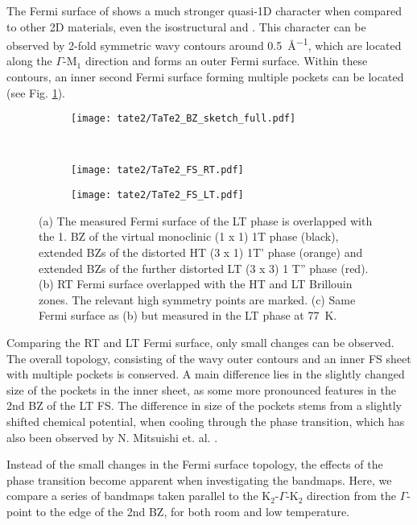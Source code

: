 The Fermi surface of  shows a much stronger quasi-1D character when compared to other 2D materials, even the isostructural  and .
This character can be observed by 2-fold symmetric wavy contours around \qty{0.5}{\angstrom^{-1}}, which are located along the $\Gamma$-M$_1$ direction and forms an outer Fermi surface.
Within these contours, an inner second Fermi surface forming multiple pockets can be located (see Fig. \ref{fig:TaTe_FS}).

\begin{figure}[h!]
	\centering
	\begin{subfigure}[b]{0.5\textwidth}
		\texttt{[image: tate2/TaTe2\_BZ\_sketch\_full.pdf]}
		\caption{}
	\end{subfigure}
	\hfill
	\\
	\begin{subfigure}[b]{0.49\textwidth}
		\texttt{[image: tate2/TaTe2\_FS\_RT.pdf]}
		\caption{}
	\end{subfigure}
	\hfill
	\begin{subfigure}[b]{0.49\textwidth}
		\texttt{[image: tate2/TaTe2\_FS\_LT.pdf]}
		\caption{}
	\end{subfigure}
	\caption{(a) The measured Fermi surface of the LT phase is overlapped with the 1. BZ of the virtual monoclinic (1 x 1) 1T phase (black), extended BZs of the distorted HT (3 x 1) 1T' phase (orange) and extended BZs of the further distorted LT (3 x 3) 1 T'' phase (red). (b) RT Fermi surface overlapped with the HT and LT Brillouin zones. The relevant high symmetry points are marked. (c) Same Fermi surface as (b) but measured in the LT phase at \qty{77}{\kelvin}.}
	\label{fig:TaTe_FS}
\end{figure}

Comparing the RT and LT Fermi surface, only small changes can be observed.
The overall topology, consisting of the wavy outer contours and an inner FS sheet with multiple pockets is conserved.
A main difference lies in the slightly changed size of the pockets in the inner sheet, as some more pronounced features in the 2nd BZ of the LT FS.
The difference in size of the pockets stems from a slightly shifted chemical potential, when cooling through the phase transition, which has also been observed by N. Mitsuishi et. al. \cite{mitsuishi_unveiling_2024}.

Instead of the small changes in the Fermi surface topology, the effects of the phase transition become apparent when investigating the bandmaps.
Here, we compare a series of bandmaps taken parallel to the K$_2$-$\Gamma$-K$_2$ direction from the $\Gamma$-point to the edge of the 2nd BZ, for both room and low temperature.


